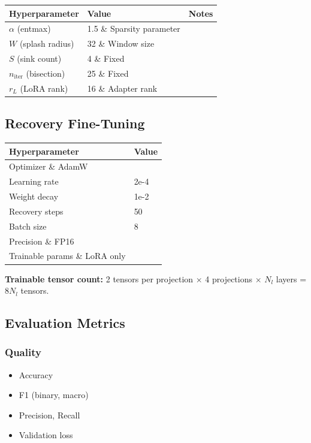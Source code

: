 \begin{table}[H]
\centering
\small
\begin{tabular}{lll}
\toprule
\textbf{Hyperparameter} & \textbf{Value} & \textbf{Notes} \\
\midrule
$\alpha$ (entmax) & 1.5 \& Sparsity parameter \\
$W$ (splash radius) & 32 \& Window size \\
$S$ (sink count) & 4 \& Fixed \\
$n_\text{iter}$ (bisection) & 25 \& Fixed \\
$r_L$ (LoRA rank) & 16 \& Adapter rank \\
\bottomrule
\end{tabular}
\end{table}

\subsection{Recovery Fine-Tuning}

\begin{table}[H]
\centering
\small
\begin{tabular}{ll}
\toprule
\textbf{Hyperparameter} & \textbf{Value} \\
\midrule
Optimizer \& AdamW \\
Learning rate & 2e-4 \\
Weight decay & 1e-2 \\
Recovery steps & 50 \\
Batch size & 8 \\
Precision \& FP16 \\
Trainable params \& LoRA only \\
\bottomrule
\end{tabular}
\end{table}

\textbf{Trainable tensor count:} 2 tensors per projection $\times$ 4 projections $\times$ $N_l$ 
layers = 8$N_l$ tensors.

\subsection{Evaluation Metrics}

\subsubsection{Quality}
\begin{itemize}
\item Accuracy
\item F1 (binary, macro)
\item Precision, Recall
\item Validation loss

\end{itemize}
